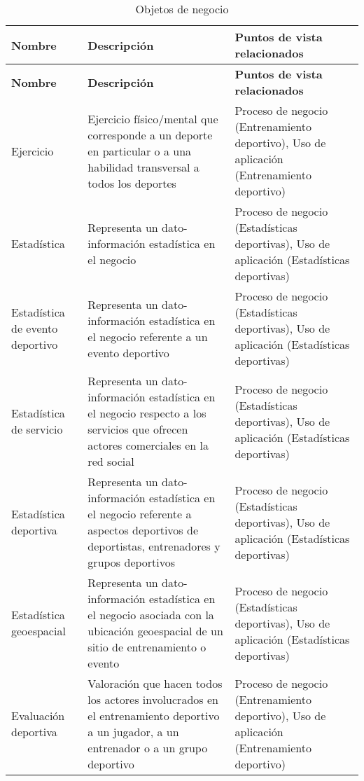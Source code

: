 \begin{center}
	\begin{longtable}{|p{4cm}|p{7cm}|p{4cm}|}
		\caption{Objetos de negocio \label{tab:objetos_negocio}} \\
		\hline
		\textbf{Nombre} &
		\textbf{Descripción} &
		\textbf{Puntos de vista relacionados} \\
		\hline
		\endfirsthead
		\hline
		\textbf{Nombre} &
		\textbf{Descripción} &
		\textbf{Puntos de vista relacionados} \\
		\hline
		\endhead
		\hline
		\endfoot
		\hline
		\endlastfoot
		Ejercicio & 
		Ejercicio físico/mental que corresponde a un deporte en particular o a una habilidad transversal a todos los deportes & 
		Proceso de negocio (Entrenamiento deportivo), Uso de aplicación (Entrenamiento deportivo)
		\\
		\hline
		Estadística & 
		Representa un dato-información estadística en el negocio & 
		Proceso de negocio (Estadísticas deportivas), Uso de aplicación (Estadísticas deportivas)
		\\
		\hline
		Estadística de evento deportivo & 
		Representa un dato-información estadística en el negocio referente a un evento deportivo & 
		Proceso de negocio (Estadísticas deportivas), Uso de aplicación (Estadísticas deportivas)
		\\
		\hline
		Estadística de servicio & 
		Representa un dato-información estadística en el negocio respecto a los servicios que ofrecen actores comerciales en la red social & 
		Proceso de negocio (Estadísticas deportivas), Uso de aplicación (Estadísticas deportivas)
		\\
		\hline
		Estadística deportiva & 
		Representa un dato-información estadística en el negocio referente a aspectos deportivos de deportistas, entrenadores y grupos deportivos & 
		Proceso de negocio (Estadísticas deportivas), Uso de aplicación (Estadísticas deportivas)
		\\
		\hline
		Estadística geoespacial & 
		Representa un dato-información estadística en el negocio asociada con la ubicación geoespacial de un sitio de entrenamiento o evento & 
		Proceso de negocio (Estadísticas deportivas), Uso de aplicación (Estadísticas deportivas)
		\\
		\hline
		Evaluación deportiva & 
		Valoración que hacen todos los actores involucrados en el entrenamiento deportivo a un jugador, a un entrenador o a un grupo deportivo & 
		Proceso de negocio (Entrenamiento deportivo), Uso de aplicación (Entrenamiento deportivo)
		\\

\end{longtable}
\end{center}
